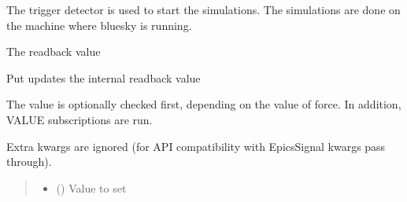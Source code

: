 \documentclass[letterpaper,10pt,english]{sphinxmanual}
\begin{document}
\begin{fulllineitems}
\label{\detokenize{API:raypyng_bluesky.detector.RaypyngTriggerDetector}}
\pysigstartsignatures
{}
\pysigstopsignatures
\sphinxAtStartPar
The trigger detector is used to start the simulations. The simulations are done on
the machine where bluesky is running.

\begin{fulllineitems}
\label{\detokenize{API:raypyng_bluesky.detector.RaypyngTriggerDetector.get}}
\pysigstartsignatures
{}
\pysigstopsignatures
\sphinxAtStartPar
The readback value

\end{fulllineitems}


\begin{fulllineitems}
\label{\detokenize{API:raypyng_bluesky.detector.RaypyngTriggerDetector.put}}
\pysigstartsignatures
{}
\pysigstopsignatures
\sphinxAtStartPar
Put updates the internal readback value

\sphinxAtStartPar
The value is optionally checked first, depending on the value of force.
In addition, VALUE subscriptions are run.

\sphinxAtStartPar
Extra kwargs are ignored (for API compatibility with EpicsSignal kwargs
pass through).
\begin{quote}\begin{description}
\begin{itemize}
\item {} 
\sphinxAtStartPar
{} () \textendash{} Value to set


\end{itemize}
\end{description}
\end{quote}
\end{fulllineitems}
\end{fulllineitems}
\end{document}
